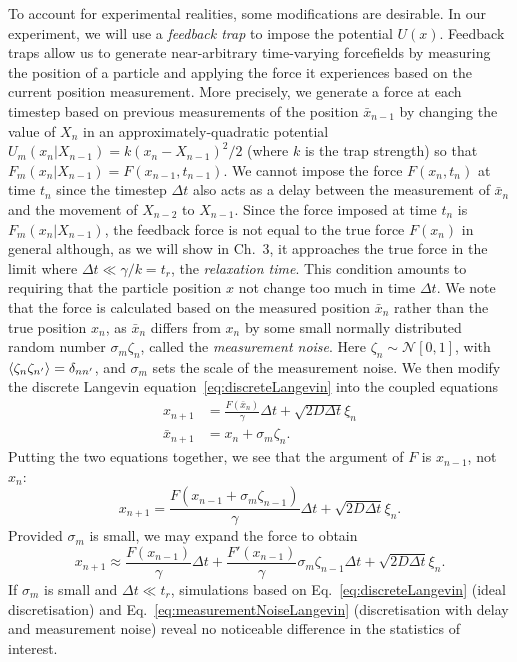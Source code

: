 \documentclass[hyperref={colorlinks=true, urlcolor=blue, citecolor=blue, final, bound}]{sfuthesis}
\begin{document}
To account for experimental realities, some modifications are desirable. In our experiment, we will use a \textit{feedback trap} to impose the potential $U(x)$. Feedback traps allow us to generate near-arbitrary time-varying forcefields by measuring the position of a particle and applying the force it experiences based on the current position measurement. More precisely, we generate a force at each timestep based on previous measurements of the position $\bar x_{n-1}$ by changing the value of $X_n$ in an approximately-quadratic potential $U_m(x_n|X_{n-1}) = k(x_n-X_{n-1})^2/2$ (where $k$ is the trap strength) so that $F_m(x_{n}|X_{n-1})=F(x_{n-1}, t_{n-1})$. We cannot impose the force $F(x_n, t_n)$ at time $t_n$ since the timestep $\Delta t$ also acts as a delay between the measurement of $\bar x_n$ and the movement of $X_{n-2}$ to $X_{n-1}$. Since the force imposed at time $t_n$ is $F_m(x_n|X_{n-1})$, the feedback force is not equal to the true force $F(x_n)$ in general although, as we will show in Ch.~3, it approaches the true force in the limit where $\Delta t\ll \gamma/k=t_r$, the \textit{relaxation time}. This condition amounts to requiring that the particle position $x$ not change too much in time $\Delta t$. We note that the force is calculated based on the measured position $\bar x_n$ rather than the true position $x_n$, as $\bar x_n$ differs from $x_n$ by some small normally distributed random number $\sigma_m\zeta_n$, called the \textit{measurement noise}. Here $\zeta_n\sim\mathcal N[0,1]$, with $\ev{\zeta_n\zeta_{n'}}=\delta_{nn'}$, and $\sigma_m$ sets the scale of the measurement noise. We then modify the discrete Langevin equation~\ref{eq:discreteLangevin} into the coupled equations
\begin{align}
    x_{n+1} &= \frac{F(\bar x_n)}{\gamma}\Delta t + \sqrt{2D\Delta t}\xi_n \label{eq:discreteLangevinMeasurementNoise}\\
    \bar x_{n+1} &= x_n + \sigma_m\zeta_n.
\end{align}
Putting the two equations together, we see that the argument of $F$ is $x_{n-1}$, not $x_n$:
\begin{equation}
    x_{n+1} = \frac{F(x_{n-1}+\sigma_m\zeta_{n-1})}{\gamma}\Delta t + \sqrt{2D\Delta t}\xi_n.
\end{equation}
Provided $\sigma_m$ is small, we may expand the force to obtain
\begin{equation}
    x_{n+1} \approx \frac{F(x_{n-1})}{\gamma}\Delta t + \frac{F'(x_{n-1})}{\gamma}\sigma_m\zeta_{n-1}\Delta t + \sqrt{2D\Delta t}\xi_n.\label{eq:measurementNoiseLangevin}
\end{equation}
If $\sigma_m$ is small and $\Delta t\ll t_r$, simulations based on Eq.~\ref{eq:discreteLangevin} (ideal discretisation) and Eq.~\ref{eq:measurementNoiseLangevin} (discretisation with delay and measurement noise) reveal no noticeable difference in the statistics of interest.
\end{document}
